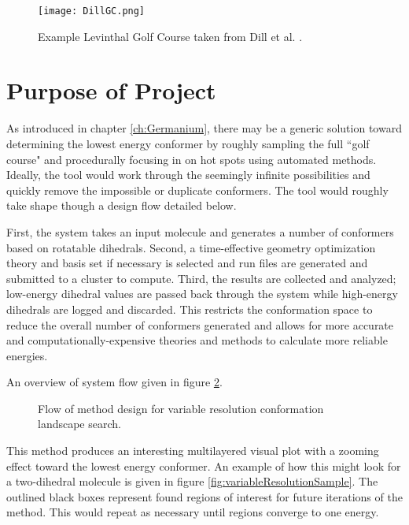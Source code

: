 \begin{figure}
	
	\centering
	
	\texttt{[image: DillGC.png]}
	
	\caption{Example Levinthal Golf Course taken from Dill et al. \cite{DillLevGC}.}
	
	\label{fig:DillGC}
	
\end{figure}


\section{Purpose of Project}

As introduced in chapter \ref{ch:Germanium}, there may be a generic solution toward determining the lowest energy conformer by roughly sampling the full ``golf course" and procedurally focusing in on hot spots using automated methods.
Ideally, the tool would work through the seemingly infinite possibilities and quickly remove the impossible or duplicate conformers.
The tool would roughly take shape though a design flow detailed below.

First, the system takes an input molecule and generates a number of conformers based on rotatable dihedrals.
Second, a time-effective geometry optimization theory and basis set if necessary is selected and run files are generated and submitted to a cluster to compute.
Third, the results are collected and analyzed; low-energy dihedral values are passed back through the system while high-energy dihedrals are logged and discarded.
This restricts the conformation space to reduce the overall number of conformers generated and allows for more accurate and computationally-expensive theories and methods to calculate more reliable energies.

An overview of system flow given in figure \ref{fig:VRSDesign}.
\begin{figure}
	\centering 
	\caption{Flow of method design for variable resolution conformation landscape search.}
	\label{fig:VRSDesign}
	
\end{figure}
This method produces an interesting multilayered visual plot with a zooming effect toward the lowest energy conformer.
An example of how this might look for a two-dihedral molecule is given in figure \ref{fig:variableResolutionSample}.
The outlined black boxes represent found regions of interest for future iterations of the method. 
This would repeat as necessary until regions converge to one energy.

